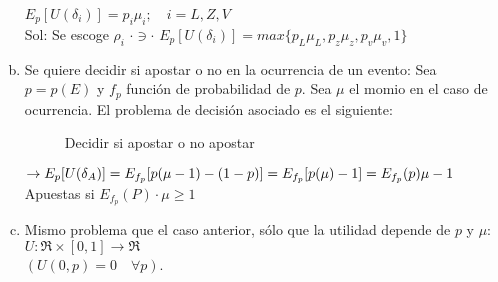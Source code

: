 \begin{enumerate}[(a)]
   $E_p[U(\delta_i)]=p_i\mu_i;\quad i=L,Z,V$\\
  
   Sol: Se escoge $\rho_i \,\, \cdot \ni \cdot \,\, E_p[U(\delta_i)]=max\{p_L\mu_L,p_z\mu_z,p_v\mu_v,1\}$
  
   \item Se quiere decidir si apostar o no en la ocurrencia de un evento: Sea $p=p(E)$ y $f_p$ función de probabilidad de $p$. Sea $\mu$ el momio en el caso de ocurrencia. El problema de decisión asociado es el siguiente:\\
 
 \begin{figure}[!ht]
 \caption{Decidir si apostar o no apostar}
 \end{figure}
 
 \newpage
  
   $\rightarrow E_p[U(\delta_A)]=E_{f_p}[p(\mu-1)-(1-p)]\\
   =E_{f_p}[p(\mu)-1]\\
   =E_{f_p}(p)\mu-1$\\

   Apuestas si $E_{f_p}(P)\cdot \mu \ge 1$
  
   \item Mismo problema que el caso anterior, sólo que la utilidad depende de $p$ y $\mu$: $U: \Re\times[0,1]\rightarrow\Re$\\
   $(U(0,p)=0\quad\forall p)$.\\
 

\end{enumerate}
